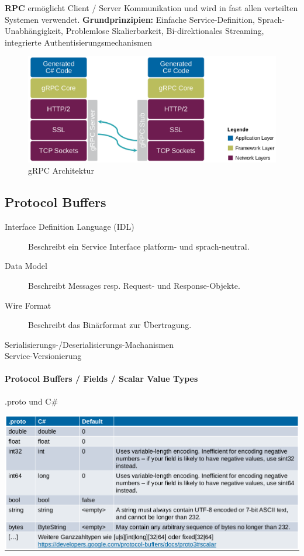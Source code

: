 \documentclass[
a4paper,
oneside,
10pt,
fleqn,
headsepline,
toc=listofnumbered, 
bibliography=totocnumbered]{scrartcl}
\begin{document}
\textbf{RPC} ermöglicht Client / Server Kommunikation und wird in fast allen verteilten Systemen verwendet.
\textbf{Grundprinzipien:} Einfache Service-Definition, Sprach-Unabhängigkeit, Problemlose Skalierbarkeit, Bi-direktionales Streaming, integrierte Authentisierungsmechanismen
\begin{figure}[h!]
\centering
\includegraphics[width=0.6\linewidth]{images/grpc_architektur.png}
\caption{gRPC Architektur}
\label{fig:grpcarchitektur}
\end{figure}

\subsection{Protocol Buffers}
\begin{description}
    \item[Interface Definition Language (IDL)] Beschreibt ein Service Interface platform- und sprach-neutral.
    \item[Data Model] Beschreibt Messages resp. Request- und Response-Objekte.
    \item[Wire Format] Beschreibt das Binärformat zur Übertragung.
    \item[Serialisierungs-/Deserialisierungs-Machanismen]
    \item[Service-Versionierung]
\end{description}

\paragraph{Protocol Buffers / Fields / Scalar Value Types} .proto und C#

\begin{minipage}[t]{0.9\textwidth}
\centering
\includegraphics[width=0.9\linewidth]{images/grpc_buffers.png}
\end{minipage}
\end{document}
